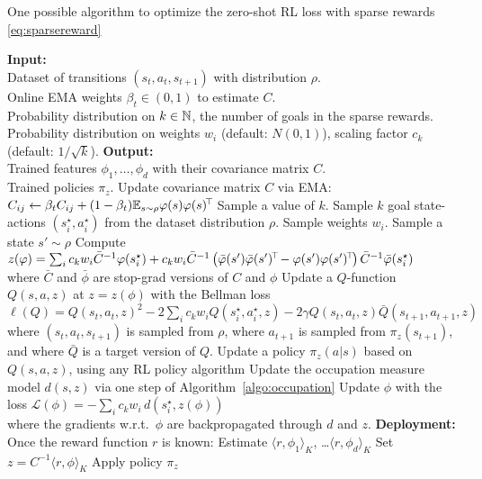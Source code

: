 \documentclass[11pt,a4paper]{article}
\newcommand{\loss}{\mathcal{L}}
\begin{document}
  \begin{algorithm}[h!]
    \small
    \caption{One possible algorithm to optimize the zero-shot RL loss
    with sparse rewards \eqref{eq:sparsereward}}
    \label{algo:sparse}
 \begin{algorithmic}
    \STATE \textbf{Input:}
    \\Dataset of transitions $(s_t,a_t,s_{t+1})$
    with distribution $\rho$.
    \\Online EMA weights $\beta_t\in (0,1)$ to estimate $C$.
    \\Probability distribution on $k\in {\mathbb{N}}$, the number of goals in the
    sparse rewards.
    \\Probability distribution on weights $w_i$ (default: $N(0,1)$),
    scaling factor $c_k$ (default: $1/\sqrt{k}$).
    \STATE \textbf{Output:}\\
    Trained features $\phi_1,\ldots,\phi_d$ with their covariance
    matrix $C$.
    \\Trained policies $\pi_z$.
    \STATE Update covariance matrix $C$ via EMA:
    $C_{ij}\gets \beta_t
    C_{ij}+(1-\beta_t)\mathbb{E}_{s\sim \rho} \varphi(s)\varphi(s)^{\!\top}\!$
    Sample a value of $k$. Sample $k$ goal state-actions
    $(s^\star_i,a^\star_i)$ from the dataset distribution $\rho$. Sample
    weights $w_i$.
    \STATE Sample a state $s'\sim \rho$
    \STATE Compute
    \algindent
    $z(\varphi)=\sum_i c_k w_i \bar C^{-1}
    \varphi(s^\star_i)+c_k w_i \bar C^{-1}
    \left(\bar{\varphi}(s')\bar{\varphi}(s')^{\!\top}\!-\varphi(s')\varphi(s')^{\!\top}\!\right)\bar
    C^{-1}\bar {\varphi}(s^\star_i)$
    \\where $\bar C$ and $\bar \phi$ are stop-grad versions of $C$ and
    $\phi$
    \STATE Update a $Q$-function $Q(s,a,z)$ at $z=z(\phi)$ with the Bellman loss
    \algindent
    $\ell(Q)=Q(s_t,a_t,z)^2-2\sum_i c_kw_iQ(s^\star_i,a^\star_i,z)-2\gamma
    Q(s_t,a_t,z)\bar Q(s_{t+1},a_{t+1},z)$
    where $(s_t,a_t,s_{t+1})$ is sampled from $\rho$, where $a_{t+1}$ is
    sampled from $\pi_z(s_{t+1})$, and where $\bar Q$ is a target version
    of $Q$.
    \STATE Update a policy $\pi_z(a|s)$ based on $Q(s,a,z)$, using any RL
    policy algorithm
    \STATE Update the occupation measure model $d(s,z)$ via one step of
    Algorithm~\ref{algo:occupation}
    \STATE Update $\phi$ with the loss
    \algindent $\loss(\phi)=-\sum_i c_k w_i\,d(s^\star_i,z(\phi))$
    \\where the gradients w.r.t.\ $\phi$ are backpropagated through $d$ and
    $z$.
    \ENDWHILE
    \STATE \textbf{Deployment:}
    \\Once the reward function $r$ is known:
    \STATE Estimate $\langle r,\phi_1\rangle_K$, \ldots $\langle
    r,\phi_d\rangle_K$
    \STATE Set $z=C^{-1}\langle r,\phi\rangle_K$
    \STATE Apply policy $\pi_z$
 \end{algorithmic}
 \end{algorithm}
\end{document}
